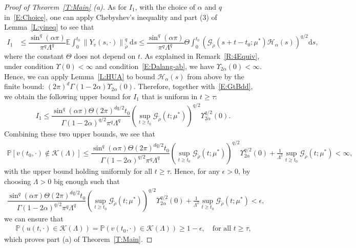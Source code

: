 \documentclass[a4paper,11pt]{article}%
\theoremstyle{plain}
\theoremstyle{definition}
\numberwithin{equation}{section}
\newcommand{\E}{\mathbb{E}}
\newcommand{\Norm}[1]{\left\| #1 \right\|}
\newcommand{\ud}{\ensuremath{\mathrm{d}}}
\begin{document}
\begin{proof}[Proof of Theorem~\ref{T:Main} (a)]
  As for $I_1$, with the choice of $\alpha$ and $q$ in~\eqref{E:Choice}, one can apply Chebyshev's
  inequality and part (3) of Lemma~\ref{L:yineq} to see that
  \begin{align*}
    I_1 & \le \dfrac{\sin^q (\alpha \pi)}{\pi^q \Lambda^q}\E \int_{0}^{t_0} \Norm{Y_v(s,\cdot)}_{\tilde{\rho}}^q \: \ud s
          \le \dfrac{\sin^q (\alpha \pi)}{\pi^q \Lambda^q} \Theta\int_0^{t_0}
          \left(\mathcal{G}_{\tilde{\rho}}(s + t-t_0;\mu^*) \mathcal{H}_{\alpha}(s)\right)^{q/2} \ud s,
  \end{align*}
  where the constant $\Theta$ does not depend on $t$. As explained in Remark~\ref{R:4Equiv}, under
  condition $\Upsilon(0)<\infty$ and condition~\eqref{E:Dalang-ab}, we have
  $\Upsilon_{2\alpha}(0)<\infty$. Hence, we can apply Lemma~\ref{L:HUA} to bound
  $\mathcal{H}_{\alpha}(s)$ from above by the finite bound: $\left(2\pi\right)^d \Gamma(1-2\alpha)
  \Upsilon_{2\alpha}(0)$. Therefore, together with~\eqref{E:GtBdd}, we obtain the following upper
  bound for $I_1$ that is uniform in $t\ge \tau$:
  \begin{align*}
    I_1 \le \dfrac{\sin^q (\alpha \pi)\Theta (2\pi)^{dq/2} t_0}{\Gamma\left(1-2\alpha\right)^{q/2}\pi^q \Lambda^q} \left(\sup_{t\ge t_0} \mathcal{G}_{\tilde{\rho}}\left(t;\mu^*\right)\right)^{q/2} \Upsilon_{2\alpha}^{q/2}(0).
  \end{align*}
  Combining these two upper bounds, we see that
  \begin{align*}
    \mathbb{P} \left[ v(t_0,\cdot) \not \in \mathscr{K}(\Lambda) \right ]
    \le
    \dfrac{\sin^q (\alpha \pi)\Theta (2\pi)^{dq/2} t_0}{\Gamma\left(1-2\alpha\right)^{q/2}\pi^q \Lambda^q} \left(\sup_{t\ge t_0} \mathcal{G}_{\tilde{\rho}}\left(t;\mu^*\right)\right)^{q/2} \Upsilon_{2\alpha}^{q/2}(0)
    +
    \frac{1}{\Lambda^2} \sup_{t\ge t_0} \mathcal{G}_{\tilde{\rho}}\left(t;\mu^*\right)
    <\infty,
  \end{align*}
  with the upper bound holding uniformly for all $t\ge \tau$. Hence, for any $\epsilon>0$, by
  choosing $\Lambda > 0$ big enough such that
  \begin{align*}
    \dfrac{\sin^q (\alpha \pi)\Theta (2\pi)^{dq/2} t_0}{\Gamma\left(1-2\alpha\right)^{q/2}\pi^q \Lambda^q} \left(\sup_{t\ge t_0} \mathcal{G}_{\tilde{\rho}}\left(t;\mu^*\right)\right)^{q/2} \Upsilon_{2\alpha}^{q/2}(0)
    +
    \frac{1}{\Lambda^2} \sup_{t\ge t_0} \mathcal{G}_{\tilde{\rho}}\left(t;\mu^*\right)
    < \epsilon,
  \end{align*}
  we can ensure that
  \begin{align*}
      \mathbb{P}\left(u(t,\cdot) \in \mathscr{K}(\Lambda)\right)
    = \mathbb{P}\left(v(t_0,\cdot) \in \mathscr{K}(\Lambda)\right)
    \ge 1- \epsilon, \quad \text{for all $t\ge \tau$,}
  \end{align*}
  which proves part (a) of Theorem~\ref{T:Main}.
\end{proof}
\end{document}

